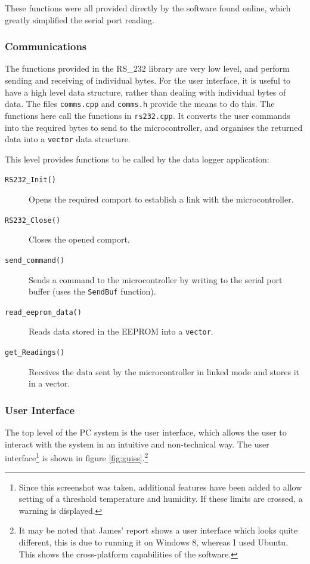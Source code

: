 \documentclass[a4paper,10pt]{article}  %
\begin{document}
These functions were all provided directly by the software found
online, which greatly simplified the serial port reading.

\subsubsection{Communications}

The functions provided in the RS\_232 library are very low level, and
perform sending and receiving of individual bytes. For the user
interface, it is useful to have a high level data structure, rather
than dealing with individual bytes of data. The files
\texttt{comms.cpp} and \texttt{comms.h} provide the means to do
this. The functions here call the functions in \texttt{rs232.cpp}. It
converts the user commands into the required bytes to send to the
microcontroller, and organises the returned data into a
\texttt{vector} data structure.

This level provides functions to be called by the data logger
application:
\begin{description}
  \item[\texttt{RS232\_Init()}] Opens the required comport to
    establish a link with the microcontroller.
  \item[\texttt{RS232\_Close()}] Closes the opened comport.
  \item[\texttt{send\_command()}] Sends a command to the
    microcontroller by writing to the serial port buffer (uses the
    \texttt{SendBuf} function).
  \item[\texttt{read\_eeprom\_data()}] Reads data stored in the EEPROM
    into a \texttt{vector}.
  \item[\texttt{get\_Readings()}] Receives the data sent by the
    microcontroller in linked mode and stores it in a vector.
\end{description}

\subsubsection{User Interface}

The top level of the PC system is the user interface, which allows the
user to interact with the system in an intuitive and non-technical
way. The user interface\footnote{Since this screenshot was taken,
  additional features have been added to allow setting of a threshold
  temperature and humidity. If these limits are crossed, a warning is
  displayed.} is shown in figure \ref{fig:guiss}.\footnote{It may be
  noted that James' report shows a user interface which looks quite
  different, this is due to running it on Windows 8, whereas I used
  Ubuntu. This shows the cross-platform capabilities of the software.}
\end{document}
